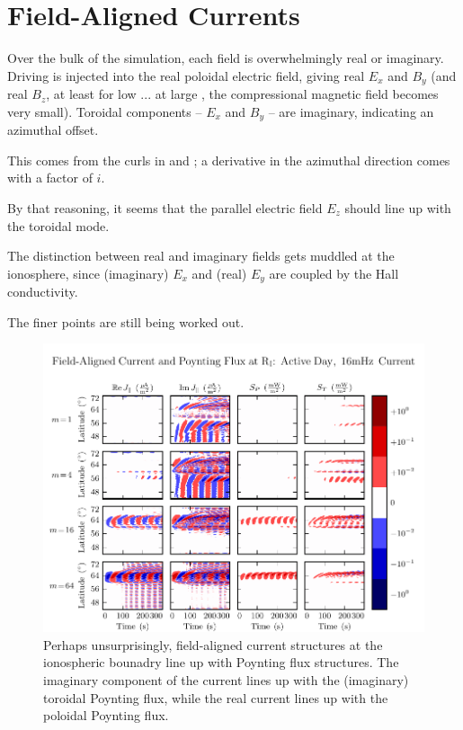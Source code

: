 \section{Field-Aligned Currents}
  \label{sec_fac}







Over the bulk of the simulation, each field is overwhelmingly real or imaginary. Driving is injected into the real poloidal electric field, giving real $E_x$ and $B_y$ (and real $B_z$, at least for low \azm... at large \azm, the compressional magnetic field becomes very small). Toroidal components -- $E_x$ and $B_y$ -- are imaginary, indicating an azimuthal offset. 

This comes from the curls in \farlaw and \amplaw; a derivative in the azimuthal direction comes with a factor of $i$. 

By that reasoning, it seems that the parallel electric field $E_z$ should line up with the toroidal mode. 

The distinction between real and imaginary fields gets muddled at the ionosphere, since (imaginary) $E_x$ and (real) $E_y$ are coupled by the Hall conductivity. 

The finer points are still being worked out. 

\begin{figure}[H]
    \centering
    \includegraphics[width=\textwidth]{figures/JS_1_016mHz.pdf}
    \caption[Field-Aligned Current and Poynting Flux at the Ionosphere]{
      Perhaps unsurprisingly, field-aligned current structures at the ionospheric bounadry line up with Poynting flux structures. The imaginary component of the current lines up with the (imaginary) toroidal Poynting flux, while the real current lines up with the poloidal Poynting flux. 
    }
    \label{fig_JS_1_016mHz}
\end{figure}

